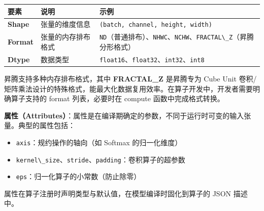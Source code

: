 \begin{longtable}[]{@{}
  >{\raggedright\arraybackslash}p{}
  >{\raggedright\arraybackslash}p{}
  >{\raggedright\arraybackslash}p{}@{}}
\toprule\noalign{}
\begin{minipage}[b]{\linewidth}\raggedright
要素
\end{minipage} & \begin{minipage}[b]{\linewidth}\raggedright
说明
\end{minipage} & \begin{minipage}[b]{\linewidth}\raggedright
示例
\end{minipage} \\
\midrule\noalign{}
\endhead
\bottomrule\noalign{}
\endlastfoot
\textbf{Shape} & 张量的维度信息 &
\passthrough{\lstinline!(batch, channel, height, width)!} \\
\textbf{Format} & 张量的内存排布格式 &
\passthrough{\lstinline!ND!}（普通排布）、\passthrough{\lstinline!NHWC!}、\passthrough{\lstinline!NCHW!}、\passthrough{\lstinline!FRACTAL\_Z!}（昇腾分形格式） \\
\textbf{Dtype} & 数据类型 &
\passthrough{\lstinline!float16!}、\passthrough{\lstinline!float32!}、\passthrough{\lstinline!int32!}、\passthrough{\lstinline!int8!} \\
\end{longtable}

昇腾支持多种内存排布格式，其中 \textbf{FRACTAL\_Z} 是昇腾专为 Cube Unit
卷积/矩阵乘法设计的特殊格式，能最大化数据复用效率。在算子开发中，开发者需要明确算子支持的
format 列表，必要时在 compute 函数中完成格式转换。

\textbf{属性（Attributes）}：属性是在编译期确定的参数，不同于运行时可变的输入张量。典型的属性包括：

\begin{itemize}
\tightlist
\item
  \passthrough{\lstinline!axis!}：规约操作的轴向（如 Softmax
  的归一化维度）
\item
  \passthrough{\lstinline!kernel\_size!}、\passthrough{\lstinline!stride!}、\passthrough{\lstinline!padding!}：卷积算子的超参数
\item
  \passthrough{\lstinline!eps!}：归一化算子的小常数（防止除零）
\end{itemize}

属性在算子注册时声明类型与默认值，在模型编译时固化到算子的 JSON 描述中。

